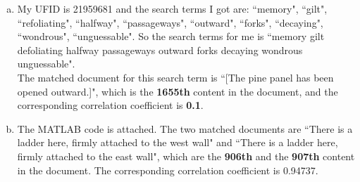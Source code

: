 \documentclass[a4paper]{article}
\begin{document}
\begin{spacing}{2.0}
\begin{enumerate}[(a)]
\begin{itemize}
\item The matched document for the search term \textbf{``the wizard of frobozz cast a spell"} is: \\
{[WIZARD] (The Wizard of Frobozz is here, eyeing you warily.)}\\
It is the \textbf{1683rd} content in the document, and the corresponding correlation coefficient is \textbf{0.4961}.

\end{itemize}

\item My UFID is 21959681 and the search terms I got are: ``memory", ``gilt", ``refoliating", ``halfway",  ``passageways", ``outward", ``forks", ``decaying", ``wondrous", ``unguessable". So the search terms for me is ``memory gilt defoliating halfway passageways outward forks decaying wondrous unguessable".\\
The matched document for this search term is ``[The pine panel has been opened outward.]", which is the \textbf{1655th} content in the document, and the corresponding correlation coefficient is \textbf{0.1}.

\item The MATLAB code is attached. The two matched documents are ``There is a ladder here, firmly attached to the west wall" and ``There is a ladder here, firmly attached to the east wall", which are the \textbf{906th} and the \textbf{907th} content in the document. The corresponding correlation coefficient is 0.94737.



\end{enumerate}


\end{spacing}
\end{document}
